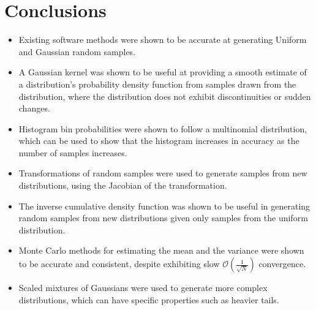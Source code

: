 \documentclass[a4paper]{article}
\begin{document}

\section{Conclusions}
\begin{itemize}
    \item Existing software methods were shown to be accurate at generating Uniform and Gaussian random samples.
    \item A Gaussian kernel was shown to be useful at providing a smooth estimate of a distribution's probability
          density function from samples drawn from the distribution, where the distribution does not exhibit
          discontinuities or sudden changes.
    \item Histogram bin probabilities were shown to follow a multinomial distribution, which can be used to show that
          the histogram increases in accuracy as the number of samples increases.
    \item Transformations of random samples were used to generate samples from new distributions, using the Jacobian
          of the transformation.
    \item The inverse cumulative density function was shown to be useful in generating random samples from new
          distributions given only samples from the uniform distribution.
    \item Monte Carlo methods for estimating the mean and the variance were shown to be accurate and consistent, despite
          exhibiting slow $\mathcal{O}\left(\frac{1}{\sqrt{N}}\right)$ convergence.
    \item Scaled mixtures of Gaussians were used to generate more complex distributions, which can have specific
          properties such as heavier tails.
\end{itemize}


\newpage
\appendix

\end{document}
